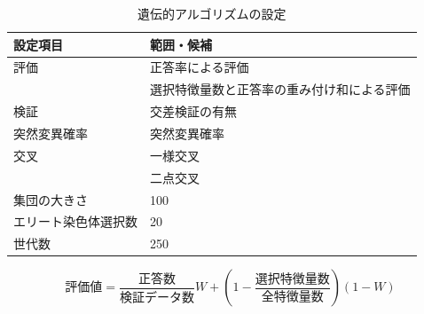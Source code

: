 \begin{table}[t]
    \caption{遺伝的アルゴリズムの設定}
    \centering
    \begin{tabular}{ll}
        \hline
        設定項目 & 範囲・候補 \\
        \hline\hline
        評価 & 正答率による評価 \\
        & 選択特徴量数と正答率の重み付け和による評価 \\
        \hline
        検証 & 交差検証の有無 \\
        \hline
        突然変異確率 & 突然変異確率 \\
        \hline
        交叉  & 一様交叉 \\
        & 二点交叉 \\
        \hline
        集団の大きさ  & 100 \\
        \hline
        エリート染色体選択数  & 20 \\
        \hline
        世代数  & 250 \\
        \hline
    \end{tabular}
    \label{tab:ga_setting}
\end{table}

\begin{equation}
    評価値 = \frac{正答数}{検証データ数} W + (1 - \frac{選択特徴量数}{全特徴量数}) (1 - W)
\end{equation}
